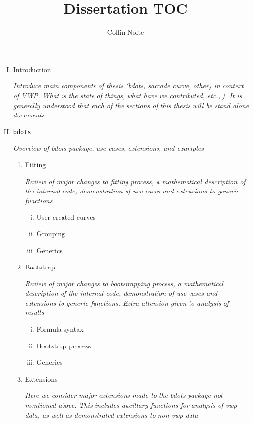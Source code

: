 \documentclass[12pt, letterpaper, twoside]{article}
\begin{document}
\title{\vspace{-3cm}Dissertation TOC}
\author{Collin Nolte}
\date{}
\maketitle

\begin{enumerate}[I.]
\item Introduction

\textit{Introduce main components of thesis (bdots, saccade curve, other) in context of VWP. What is the state of things, what have we contributed, etc.,.). It is generally understood that each of the sections of this thesis will be stand alone documents}
\item \texttt{bdots}

\textit{Overview of bdots package, use cases, extensions, and examples}
  \begin{enumerate}[1.]
  \item Fitting

\textit{Review of major changes to fitting process, a mathematical description of the internal code, demonstration of use cases and extensions to generic functions}  
  
    \begin{enumerate}[i.]
    \item User-created curves
    \item Grouping
    \item Generics
    \end{enumerate}
  \item Bootstrap

\textit{Review of major changes to bootstrapping process, a mathematical description of the internal code, demonstration of use cases and extensions to generic functions. Extra attention given to analysis of results}    
  
    \begin{enumerate}[i.]
    \item Formula syntax
    \item Bootstrap process
    \item Generics
    \end{enumerate}
  \item Extensions

  \textit{Here we consider major extensions made to the bdots package not mentioned above. This includes ancillary functions for analysis of vwp data, as well as demonstrated extensions to non-vwp data} 
  

\end{enumerate}
\end{enumerate}
\end{document}
